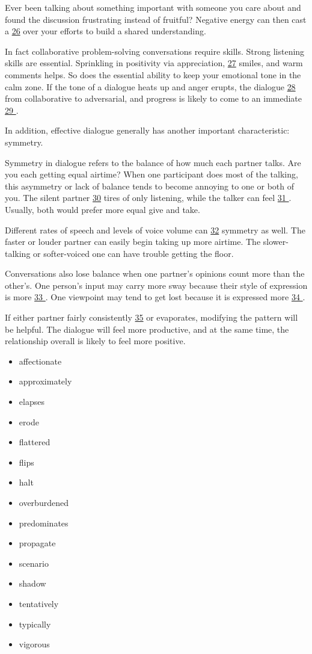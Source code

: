 \documentclass[UTF8,11pt]{ctexart}
\begin{document}
Ever been talking about something important with someone you care about and found the discussion frustrating instead of fruitful? Negative energy can then cast a \uline{26} over your efforts to build a shared understanding.


In fact collaborative problem-solving conversations require skills. Strong listening skills are essential. Sprinkling in positivity via appreciation, \uline{27} smiles, and warm comments helps. So does the essential ability to keep your emotional tone in the calm zone. If the tone of a dialogue heats up and anger erupts, the dialogue \uline{28} from collaborative to adversarial, and progress is likely to come to an immediate \uline{29 }.


In addition, effective dialogue generally has another important characteristic: symmetry.


Symmetry in dialogue refers to the balance of how much each partner talks. Are you each getting equal airtime? When one participant does most of the talking, this asymmetry or lack of balance tends to become annoying to one or both of you. The silent partner \uline{30} tires of only listening, while the talker can feel \uline{31 }. Usually, both would prefer more equal give and take.


Different rates of speech and levels of voice volume can \uline{32} symmetry as well. The faster or louder partner can easily begin taking up more airtime. The slower-talking or softer-voiced one can have trouble getting the floor.


Conversations also lose balance when one partner’s opinions count more than the other’s. One person’s input may carry more sway because their style of expression is more \uline{33 }. One viewpoint may tend to get lost because it is expressed more \uline{34 }.


If either partner fairly consistently \uline{35} or evaporates, modifying the pattern will be helpful. The dialogue will feel more productive, and at the same time, the relationship overall is likely to feel more positive.


\begin{itemize}[leftmargin=2em,itemsep=.2em,topsep=.4em]\item[A.] affectionate
\item[B.] approximately
\item[C.] elapses
\item[D.] erode
\item[E.] flattered
\item[F.] flips
\item[G.] halt
\item[H.] overburdened
\item[I.] predominates
\item[J.] propagate
\item[K.] scenario
\item[L.] shadow
\item[M.] tentatively
\item[N.] typically
\item[O.] vigorous
\end{itemize}
\end{document}
